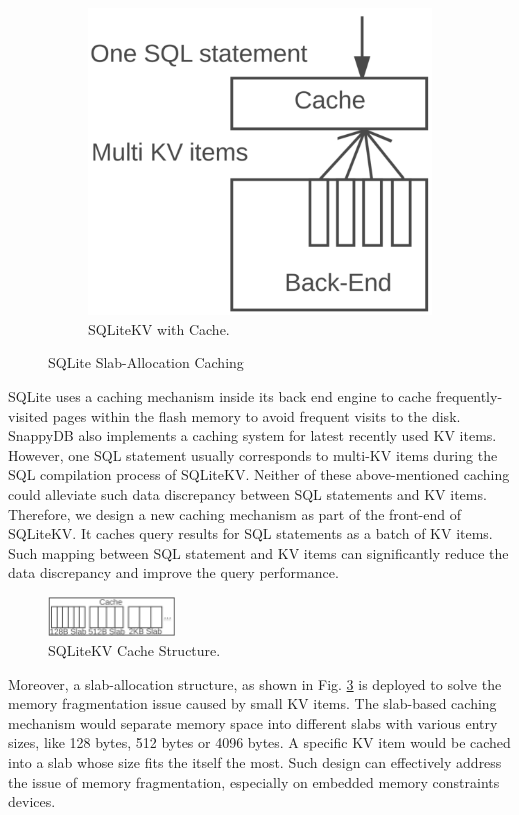 \begin{figure}[h]
\begin{subfigure}[b]{0.35\textwidth}
			\includegraphics[width=\textwidth]{pic/SQLiteKVCache.pdf}
			\caption{SQLiteKV with Cache.}
			\label{fig:SQLiteKVcache}
		\end{subfigure}
	\caption{SQLite Slab-Allocation Caching}
	\label{fig:cache}
	\end{figure}
	 SQLite uses a caching mechanism inside its back end engine to cache frequently-visited pages within the flash memory to avoid frequent visits to the disk. SnappyDB also implements a caching system for latest recently used KV items. However, one SQL statement usually corresponds to multi-KV items during the SQL compilation process of SQLiteKV. Neither of these above-mentioned caching could alleviate such data discrepancy between SQL statements and KV items. Therefore, we design a new caching mechanism as part of the front-end of SQLiteKV. It caches query results for SQL statements as a batch of KV items. Such mapping between SQL statement and KV items can significantly reduce the data discrepancy and improve the query performance.
	 \begin{figure}
	 	\centering
	 	\includegraphics[width=0.3\textwidth]{pic/SQLiteKVCache2.pdf}
	 	\caption{SQLiteKV Cache Structure.}
	 	\label{fig:SQLiteCache2}
	 	\centering
	 \end{figure}
	 Moreover, a slab-allocation structure, as shown in Fig. \ref{fig:SQLiteCache2} is deployed to solve the memory fragmentation issue caused by small KV items. The slab-based caching mechanism would separate memory space into different slabs with various entry sizes, like 128 bytes, 512 bytes or 4096 bytes. A specific KV item would be cached into a slab whose size fits the itself the most. Such design can effectively address the issue of memory fragmentation, especially on embedded memory constraints devices.

